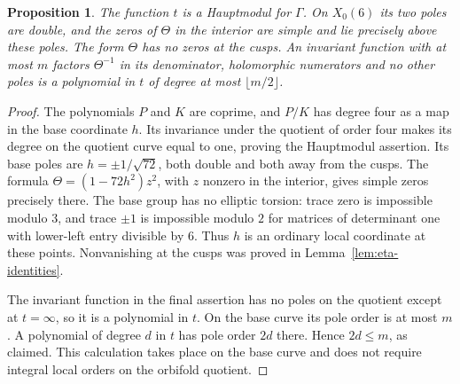 \documentclass[11pt,a4paper]{article}
\newtheorem{proposition}[theorem]{Proposition}
\theoremstyle{remark}
\begin{document}
\begin{proposition}\label{prop:geometry}
The function $t$ is a Hauptmodul for $\Gamma$.
On $X_0(6)$ its two poles are double, and the zeros of $\Theta$
in the interior are simple and lie precisely above these poles.
The form $\Theta$ has no zeros at the cusps.
An invariant function with at most $m$ factors $\Theta^{-1}$ in
its denominator, holomorphic numerators and no other poles is a
polynomial in $t$ of degree at most $\lfloor m/2\rfloor$.
\end{proposition}
\begin{proof}
The polynomials $P$ and $K$ are coprime, and $P/K$ has degree four
as a map in the base coordinate $h$.
Its invariance under the quotient of order four makes its degree
on the quotient curve equal to one, proving the Hauptmodul assertion.
Its base poles are $h=\pm1/\sqrt{72}$, both double and both away
from the cusps. The formula $\Theta=(1-72h^2)z^2$, with $z$
nonzero in the interior, gives simple zeros precisely there.
The base group has no elliptic torsion: trace zero is impossible
modulo $3$, and trace $\pm1$ is impossible modulo $2$ for matrices
of determinant one with lower-left entry divisible by $6$.
Thus $h$ is an ordinary local coordinate at these points.
Nonvanishing at the cusps was proved in
Lemma~\ref{lem:eta-identities}.

The invariant function in the final assertion has no poles on the
quotient except at $t=\infty$, so it is a polynomial in $t$.
On the base curve its pole order is at most $m$.
A polynomial of degree $d$ in $t$ has pole order $2d$ there.
Hence $2d\le m$, as claimed. This calculation takes place on the
base curve and does not require integral local orders on the
orbifold quotient.
\end{proof}
\end{document}
